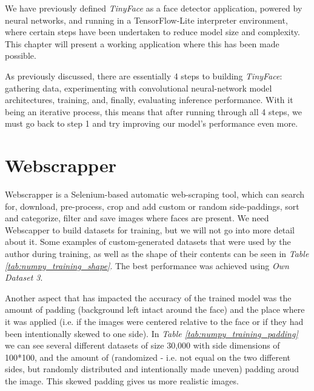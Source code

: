 We have previously defined \textit{TinyFace} as a face detector application, powered by neural networks, and running in a TensorFlow-Lite interpreter environment, where certain steps have been undertaken to reduce model size and complexity. This chapter will present a working application where this has been made possible. \par
As previously discussed, there are essentially 4 steps to building \textit{TinyFace}: gathering data, experimenting with convolutional neural-network model architectures, training, and, finally, evaluating inference performance. With it being an iterative process, this means that after running through all 4 steps, we must go back to step 1 and try improving our model's performance even more. \par

\section{Webscrapper}

Webscrapper is a Selenium-based automatic web-scraping tool, which can search for, download, pre-process, crop and add custom or random side-paddings, sort and categorize, filter and save images where faces are present. We need Webscapper to build datasets for training, but we will not go into more detail about it. Some examples of custom-generated datasets that were used by the author during training, as well as the shape of their contents can be seen in \textit{Table \ref{tab:numpy_training_shape}}. The best performance was achieved using \textit{Own Dataset 3}. \par
Another aspect that has impacted the accuracy of the trained model was the amount of padding (background left intact around the face) and the place where it was applied (i.e. if the images were centered relative to the face or if they had been intentionally skewed to one side). In \textit{Table \ref{tab:numpy_training_padding}} we can see several different datasets of size 30,000 with side dimensions of 100*100, and the amount of (randomized - i.e. not equal on the two different sides, but randomly distributed and intentionally made uneven) padding aroud the image. This skewed padding gives us more realistic images.
